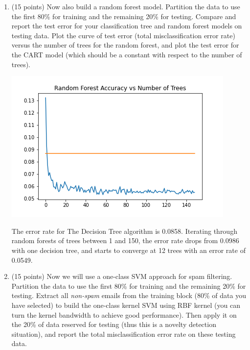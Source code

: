 \documentclass[twoside,10pt]{article}
\begin{document}
\begin{enumerate}
\begin{enumerate}
\clearpage

\item (15 points) Now also build a random forest model. Partition the data to use the first 80\% for training and the remaining 20\% for testing. Compare and report the test error for your classification tree and random forest models on testing data. Plot the curve of test error (total misclassification error rate) versus the number of trees for the random forest, and plot the test error for the CART model (which should be a constant with respect to the number of trees). 

\vspace{5 mm}

\includegraphics[scale=0.6]{spam_rf150}

The error rate for The Decision Tree algorithm is 0.0858.  Iterating through random forests of trees between 1 and 150, the error rate drops from 0.0986 with one decision tree, and starts to converge at 12 trees with an error rate of 0.0549.

\vspace{5 mm}

\item (15 points) Now we will use a one-class SVM approach for spam filtering. Partition the data to use the first 80\% for training and the remaining 20\% for testing. Extract all {\it non-spam} emails from the training block (80\% of data you have selected) to build the one-class kernel SVM using RBF kernel (you can turn the kernel bandwidth to achieve good performance). Then apply it on the 20\% of data reserved for testing (thus this is a novelty detection situation), and report the total misclassification error rate on these testing data. 

\vspace{5 mm}


\end{enumerate}
\end{enumerate}
\end{document}
